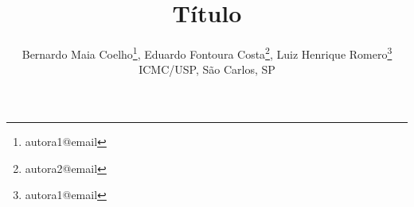 \documentclass{pssbmac}
\begin{document}

\title{Título}

\author{
    {\large Bernardo Maia Coelho}\thanks{autora1@email},
    {\large Eduardo Fontoura Costa}\thanks{autora2@email},
    {\large Luiz Henrique Romero}\thanks{autora1@email}\\
    {\small ICMC/USP, São Carlos, SP} \\
}
\criartitulo























\printbibliography
\end{document}
